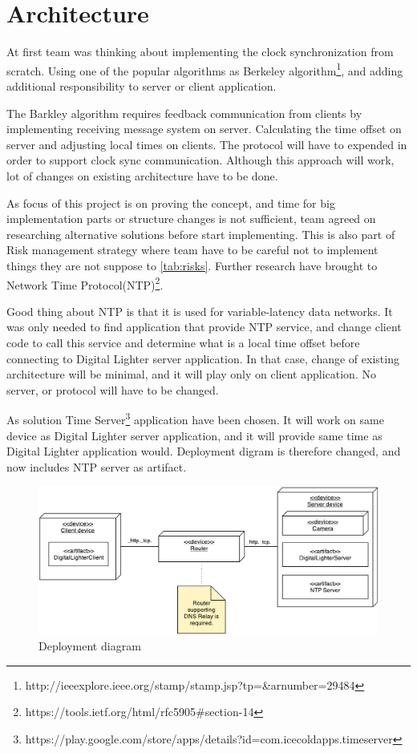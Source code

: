 \section{Architecture}

At first team was thinking about implementing the clock synchronization from scratch. Using one of the popular algorithms as Berkeley algorithm\footnote{http://ieeexplore.ieee.org/stamp/stamp.jsp?tp=\&arnumber=29484}, and adding additional responsibility to server or client application. 

The Barkley algorithm requires feedback communication from clients by implementing receiving message system on server. Calculating the time offset on server and adjusting local times on clients. The protocol will have to expended in order to support clock sync communication. Although this approach will work, lot of changes on existing architecture have to be done.

As focus of this project is on proving the concept, and time for big implementation parts or structure changes is not sufficient, team agreed on researching alternative solutions before start implementing. This is also part of Risk management strategy where team have to be careful not to implement things they are not suppose to \ref{tab:risks}. Further research have brought to Network Time Protocol(NTP)\footnote{https://tools.ietf.org/html/rfc5905\#section-14}.

Good thing about NTP is that it is used for variable-latency data networks. It was only needed to find application that provide NTP service, and change client code to call this service and determine what is a local time offset before connecting to Digital Lighter server application. In that case, change of existing architecture will be minimal, and it will play only on client application. No server, or protocol will have to be changed.

As solution Time Server\footnote{https://play.google.com/store/apps/details?id=com.icecoldapps.timeserver} application have been chosen. It will work on same device as Digital Lighter server application, and it will provide same time as Digital Lighter application would. Deployment digram is therefore changed, and now includes NTP server as artifact. 

\begin{figure}[H]
	\centering
		\includegraphics[width=15cm]{images/deployment-diagram-sprint5}
	\caption{Deployment diagram}
	\label{fig:sprint5_deployment_diagram}
\end{figure}

